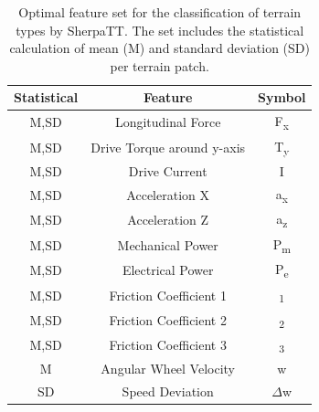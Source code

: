 \begin{table}[!htb]
   \centering
    \begin{supertabular}{ccc}
    \textbf{Statistical} & \textbf{Feature}  & \textbf{Symbol} \\
    \hline
     M,SD	&  Longitudinal Force	 & F\textsubscript{x} \\ 
     M,SD	&  Drive Torque	around y-axis  & T\textsubscript{y} \\ 
     M,SD	&  Drive Current	 & I \\  
     M,SD	&  Acceleration X	 &  a\textsubscript{x}\\ 
     M,SD	&  Acceleration Z	 & a\textsubscript{z} \\ 
     M,SD	&  Mechanical Power	 & P\textsubscript{m} \\ 
     M,SD	&  Electrical Power	 & P\textsubscript{e} \\ 
     M,SD	&  Friction Coefficient 1	 & \textmu \textsubscript{1} \\ 
     M,SD	&  Friction Coefficient 2 & \textmu \textsubscript{2}\\ 
     M,SD	&  Friction Coefficient 3	 & \textmu \textsubscript{3}\\ 
     M	    &  Angular Wheel Velocity	     &  w      \\ 
     SD    	&  Speed Deviation	 & $\Delta$w\\ 
    \end{supertabular}	
    \caption{Optimal feature set for the classification of terrain types by SherpaTT. The set includes the statistical calculation of mean (M) and standard deviation (SD) per terrain patch.\label{table:features2}}
\end{table}

%
%